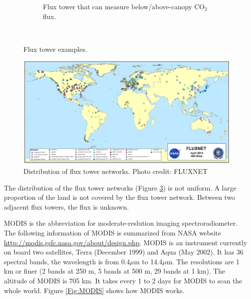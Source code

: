 \documentclass{article}\usepackage[]{graphicx}\usepackage[]{color}
\begin{document}
\begin{figure}[!ht]
\begin{subfigure}[ht]{0.3\textwidth}
        \caption{Flux tower that can measure below/above-canopy CO$_2$ flux.}
        \label{Fig:canopy}
    \end{subfigure}
        ~ %
    \caption{Flux tower examples.}\label{Fig:fluxtowers}
\end{figure}

\begin{figure}[!ht]
\begin{center}
\includegraphics[width=13cm]{Fluxnet.png}
\caption{Distribution of flux tower networks. Photo credit: FLUXNET}
\label{Fig:Fluxnet}
\end{center}
\end{figure}

The distribution of the flux tower networks (Figure \ref{Fig:Fluxnet}) is not uniform.  A large proportion of the land is not covered by the flux tower network.  Between two adjacent flux towers, the flux is unknown. 

\smallskip

MODIS is the abbreviation for moderate-reslution imaging spectroradiometer.
The following information of MODIS is summarized from NASA website \url{http://modis.gsfc.nasa.gov/about/design.php}. MODIS is an instrument currently on board two satellites, Terra (December 1999) and Aqua (May 2002). It has 36 spectral bands, the wavelength is from 0.4$\mu$m to 14.4$\mu$m. The resolutions are 1 km or finer (2 bands at 250 m, 5 bands at 500 m, 29 bands at 1 km). The altitude of MODIS is 705 km.  It takes every 1 to 2 days for MODIS to scan the whole world.
 Figure \ref{Fig:MODIS} shows how MODIS works.
\end{document}

